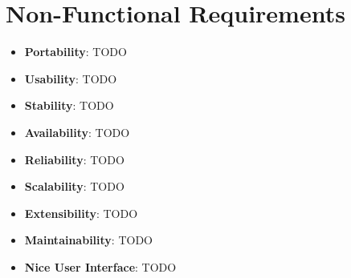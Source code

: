 \section{Non-Functional Requirements}
\begin{itemize}
	\item \textbf{Portability}: TODO
	\item \textbf{Usability}: TODO
	\item \textbf{Stability}: TODO
	\item \textbf{Availability}: TODO
	\item \textbf{Reliability}: TODO
	\item \textbf{Scalability}: TODO
	\item \textbf{Extensibility}: TODO
	\item \textbf{Maintainability}: TODO
	\item \textbf{Nice User Interface}: TODO
\end{itemize}

